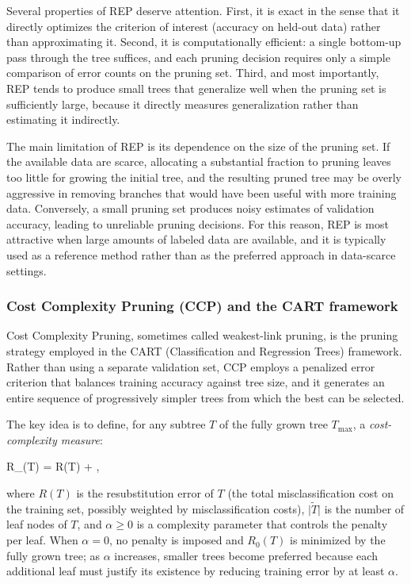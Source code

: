 Several properties of REP deserve attention. First, it is exact in the sense that it
directly optimizes the criterion of interest (accuracy on held-out data) rather than
approximating it. Second, it is computationally efficient: a single bottom-up pass through
the tree suffices, and each pruning decision requires only a simple comparison of
error counts on the pruning set. Third, and most importantly, REP tends to produce small
trees that generalize well when the pruning set is sufficiently large, because it directly
measures generalization rather than estimating it indirectly.

The main limitation of REP is its dependence on the size of the pruning set. If the
available data are scarce, allocating a substantial fraction to pruning leaves too little
for growing the initial tree, and the resulting pruned tree may be overly aggressive in
removing branches that would have been useful with more training data. Conversely, a small
pruning set produces noisy estimates of validation accuracy, leading to unreliable pruning
decisions. For this reason, REP is most attractive when large amounts of labeled data are
available, and it is typically used as a reference method rather than as the preferred
approach in data-scarce settings.

\subsubsection*{Cost Complexity Pruning (CCP) and the CART framework}

Cost Complexity Pruning, sometimes called weakest-link pruning, is the pruning strategy
employed in the CART (Classification and Regression Trees) framework. Rather than using a separate validation set, CCP employs a
penalized error criterion that balances training accuracy against tree size, and it generates
an entire sequence of progressively simpler trees from which the best can be selected.

The key idea is to define, for any subtree $T$ of the fully grown tree $T_{\max}$, a
\emph{cost-complexity measure}:
\begin{myequation}
R_\alpha(T) = R(T) + \alpha \lvert {} \rvert,
\end{myequation}
where $R(T)$ is the resubstitution error of $T$ (the total misclassification cost on the
training set, possibly weighted by misclassification costs), $\lvert \tilde{T} \rvert$ is
the number of leaf nodes of $T$, and $\alpha \geq 0$ is a complexity parameter that controls
the penalty per leaf. When $\alpha = 0$, no penalty is imposed and $R_0(T)$ is minimized by
the fully grown tree; as $\alpha$ increases, smaller trees become preferred because each
additional leaf must justify its existence by reducing training error by at least $\alpha$.

